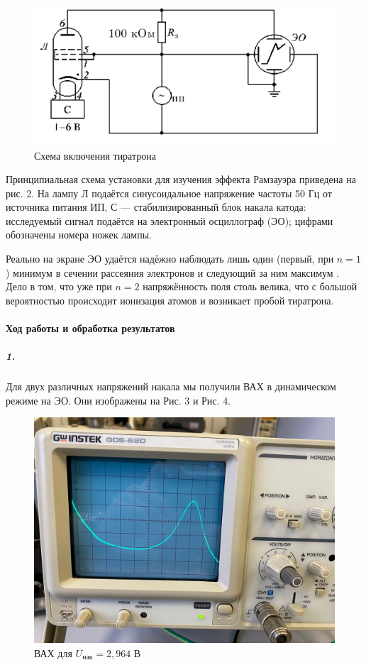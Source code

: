 \documentclass[a4paper,12pt]{article}
\begin{document}
\begin{figure}[!h]
\centering
\includegraphics[width=0.8\linewidth]{Безымянный1.png}
\caption{Схема включения тиратрона}
\label{fig:mpr}
\end{figure}

Принципиальная схема установки для
изучения эффекта Рамзауэра приведена
на рис. 2. На лампу Л подаётся синусоидальное напряжение частоты 50 Гц от источника питания ИП, С — стабилизированный блок накала катода: исследуемый
сигнал подаётся на электронный осциллограф (ЭО); цифрами обозначены номера
ножек лампы.

Реально на экране ЭО удаётся надёжно наблюдать лишь один (первый, при $n=1$)
минимум в сечении рассеяния электронов и следующий за ним максимум .
Дело в том, что уже при $n=2$ напряжённость поля столь велика, что с большой вероятностью происходит ионизация атомов и возникает пробой тиратрона.

\paragraph{Ход работы и обработка результатов}

\subparagraph{1.}Для двух различных напряжений накала мы получили ВАХ в динамическом режиме на ЭО. Они изображены на Рис. 3 и Рис. 4.

\begin{figure}[!h]
\centering
\includegraphics[width=0.7\linewidth]{cDMKSWgLqa4.jpg}
\caption{ВАХ для $U_{нак}=2,964$ В}
\label{fig:mpr}
\end{figure}
\end{document}
